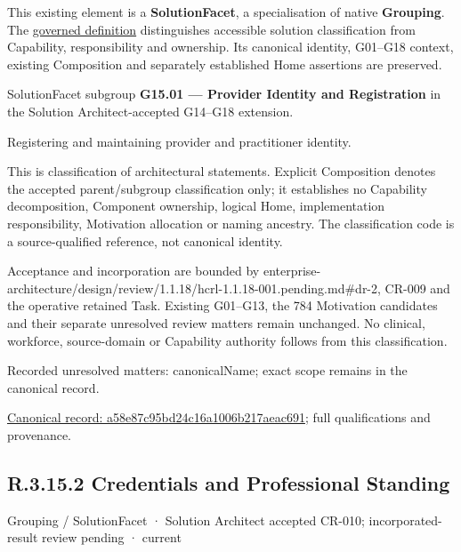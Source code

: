 This existing element is a \textbf{SolutionFacet}, a specialisation of native
\textbf{Grouping}. The \href{\detokenize{../../../../../../../governance/continuum-representation.md#solutionfacet-classification--1119-candidate}}{governed definition}
distinguishes accessible solution classification from Capability, responsibility
and ownership. Its canonical identity, G01–G18 context, existing Composition
and separately established Home assertions are preserved.



SolutionFacet subgroup \textbf{G15.01 — Provider Identity and Registration} in the Solution Architect-accepted G14–G18 extension.



Registering and maintaining provider and practitioner identity.



This is classification of architectural statements. Explicit Composition denotes the accepted parent/subgroup classification only; it establishes no Capability decomposition, Component ownership, logical Home, implementation responsibility, Motivation allocation or naming ancestry. The classification code is a source-qualified reference, not canonical identity.



Acceptance and incorporation are bounded by enterprise-architecture/design/review/1.1.18/hcrl-1.1.18-001.pending.md\#dr-2, CR-009 and the operative retained Task. Existing G01–G13, the 784 Motivation candidates and their separate unresolved review matters remain unchanged. No clinical, workforce, source-domain or Capability authority follows from this classification.


{\small Recorded unresolved matters: canonicalName; exact scope remains in the canonical record.}\par
{\footnotesize \href{../../../../../../../continuum/grouping/a58e87c95bd24c16a1006b217aeac691.md}{Canonical record: a58e87c95bd24c16a1006b217aeac691}; full qualifications and provenance.}\par
\subsection*{R.3.15.2 Credentials and Professional Standing}
\label{navigation:R.3.15.2}

\label{element:2ad6333e5858456dba8aefeec71773a5}
{\small Grouping / SolutionFacet · Solution Architect accepted CR-010; incorporated-result review pending · current}\par

